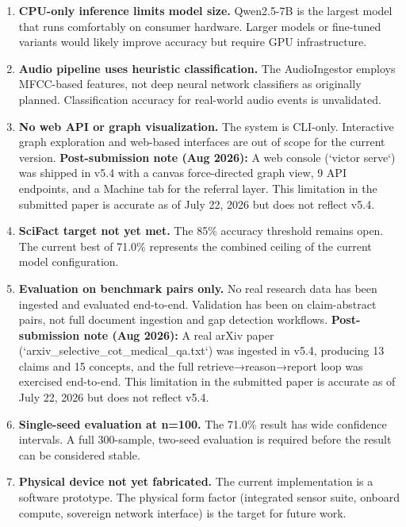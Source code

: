 \documentclass[letterpaper]{article}          %
\theoremstyle{plain}
\theoremstyle{definition}
\theoremstyle{remark}
\begin{document}
\begin{enumerate}
    \item \textbf{CPU-only inference limits model size.} Qwen2.5-7B is the
    largest model that runs comfortably on consumer hardware. Larger models or
    fine-tuned variants would likely improve accuracy but require GPU
    infrastructure.
    \item \textbf{Audio pipeline uses heuristic classification.} The
    AudioIngestor employs MFCC-based features, not deep neural network
    classifiers as originally planned. Classification accuracy for real-world
    audio events is unvalidated.
\item \textbf{No web API or graph visualization.} The system is CLI-only.
Interactive graph exploration and web-based interfaces are out of scope for
the current version. \textbf{Post-submission note (Aug 2026):} A web console
(`victor serve`) was shipped in v5.4 with a canvas force-directed graph view,
9 API endpoints, and a Machine tab for the referral layer. This limitation in
the submitted paper is accurate as of July 22, 2026 but does not reflect
v5.4.
    \item \textbf{SciFact target not yet met.} The 85\% accuracy threshold
    remains open. The current best of 71.0\% represents the combined ceiling of
    the current model configuration.
\item \textbf{Evaluation on benchmark pairs only.} No real research data has
been ingested and evaluated end-to-end. Validation has been on claim-abstract
pairs, not full document ingestion and gap detection workflows. \textbf{Post-submission
note (Aug 2026):} A real arXiv paper (`arxiv_selective_cot_medical_qa.txt`)
was ingested in v5.4, producing 13 claims and 15 concepts, and the full
retrieve→reason→report loop was exercised end-to-end. This limitation in the
submitted paper is accurate as of July 22, 2026 but does not reflect v5.4.
    \item \textbf{Single-seed evaluation at n=100.} The 71.0\% result has wide
    confidence intervals. A full 300-sample, two-seed evaluation is required
    before the result can be considered stable.
    \item \textbf{Physical device not yet fabricated.} The current implementation
    is a software prototype. The physical form factor (integrated sensor suite,
    onboard compute, sovereign network interface) is the target for future work.
\end{enumerate}

\end{document}
